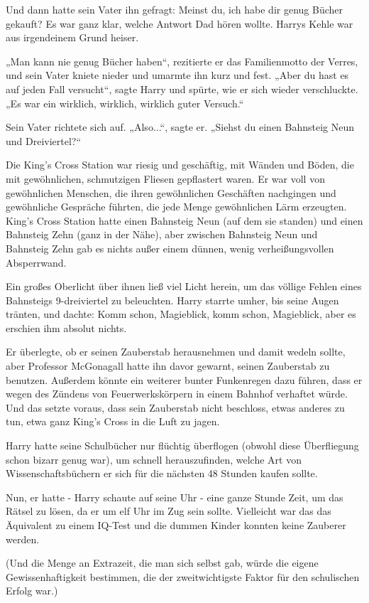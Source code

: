 {Und dann hatte sein Vater ihn gefragt: Meinst du, ich habe dir genug Bücher gekauft? Es war ganz klar, welche Antwort Dad hören wollte. Harrys Kehle war aus irgendeinem Grund heiser.

„Man kann nie genug Bücher haben“, rezitierte er das Familienmotto der Verres, und sein Vater kniete nieder und umarmte ihn kurz und fest. „Aber du hast es auf jeden Fall versucht“, sagte Harry und spürte, wie er sich wieder verschluckte. „Es war ein wirklich, wirklich, wirklich guter Versuch.“

Sein Vater richtete sich auf. „Also...“, sagte er. „Siehst du einen Bahnsteig Neun und Dreiviertel?“

Die King's Cross Station war riesig und geschäftig, mit Wänden und Böden, die mit gewöhnlichen, schmutzigen Fliesen gepflastert waren. Er war voll von gewöhnlichen Menschen, die ihren gewöhnlichen Geschäften nachgingen und gewöhnliche Gespräche führten, die jede Menge gewöhnlichen Lärm erzeugten. King's Cross Station hatte einen Bahnsteig Neun (auf dem sie standen) und einen Bahnsteig Zehn (ganz in der Nähe), aber zwischen Bahnsteig Neun und Bahnsteig Zehn gab es nichts außer einem dünnen, wenig verheißungsvollen Absperrwand.

Ein großes Oberlicht über ihnen ließ viel Licht herein, um das völlige Fehlen eines Bahnsteigs 9-dreiviertel zu beleuchten. Harry starrte umher, bis seine Augen tränten, und dachte: Komm schon, Magieblick, komm schon, Magieblick, aber es erschien ihm absolut nichts.

Er überlegte, ob er seinen Zauberstab herausnehmen und damit wedeln sollte, aber Professor McGonagall hatte ihn davor gewarnt, seinen Zauberstab zu benutzen. Außerdem könnte ein weiterer bunter Funkenregen dazu führen, dass er wegen des Zündens von Feuerwerkskörpern in einem Bahnhof verhaftet würde. Und das setzte voraus, dass sein Zauberstab nicht beschloss, etwas anderes zu tun, etwa ganz King's Cross in die Luft zu jagen.

Harry hatte seine Schulbücher nur flüchtig überflogen (obwohl diese Überfliegung schon bizarr genug war), um schnell herauszufinden, welche Art von Wissenschaftsbüchern er sich für die nächsten 48 Stunden kaufen sollte.

Nun, er hatte - Harry schaute auf seine Uhr - eine ganze Stunde Zeit, um das Rätsel zu lösen, da er um elf Uhr im Zug sein sollte. Vielleicht war das das Äquivalent zu einem IQ-Test und die dummen Kinder konnten keine Zauberer werden.

(Und die Menge an Extrazeit, die man sich selbst gab, würde die eigene Gewissenhaftigkeit bestimmen, die der zweitwichtigste Faktor für den schulischen Erfolg war.)

}
